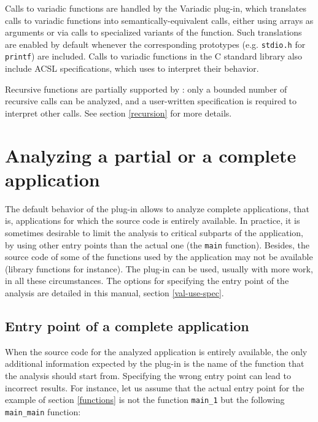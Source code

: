 \documentclass{frama-c-book}
\begin{document}

Calls to variadic functions are handled by the \textsf{Variadic} plug-in, which
translates calls to variadic functions into semantically-equivalent calls,
either using arrays as arguments or via calls to specialized variants of the
function. Such translations are enabled by default whenever the corresponding
prototypes (e.g. \lstinline|stdio.h| for \lstinline|printf|) are included.
Calls to variadic functions in the C standard library also include
ACSL specifications, which \Eva{} uses to interpret their behavior.

Recursive functions are partially supported by \Eva{}: only a bounded
number of recursive calls can be analyzed, and a user-written specification
is required to interpret other calls.
See section \ref{recursion} for more details.

\section{Analyzing a partial or a complete application}

The default behavior of the \Eva{} plug-in allows to
analyze complete applications,
that is, applications for which the source code is entirely
available. In practice, it is sometimes desirable to limit the analysis
to critical subparts of the application, by using other entry points
than the actual one (the \lstinline|main| function).
Besides, the source code of some of the functions used by
the application may not be available (library functions for instance).
The plug-in can be used, usually with more work, in all these circumstances.
The options for specifying the entry point of the analysis are detailed
in this manual, section \ref{val-use-spec}.

\subsection{Entry point of a complete application}

When the source code for the analyzed application is entirely
available, the only additional information expected by the plug-in is
the name of the function that the analysis should start from. Specifying the
wrong entry point can lead to incorrect results. For instance, let us
assume that the actual entry point for the example of section
\ref{functions} is not the function \lstinline|main_1| but the following
\lstinline|main_main| function:
\end{document}
